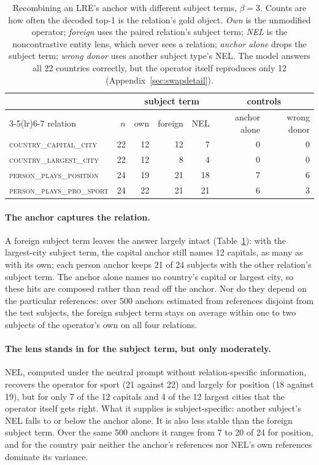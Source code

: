 \begin{table}[t]
\centering
\small
\begin{tabular}{lrrrrrr}
\toprule
& & \multicolumn{3}{c}{subject term} & \multicolumn{2}{c}{controls} \\
\cmidrule(lr){3-5}\cmidrule(lr){6-7}
relation & $n$ & own & foreign & NEL & anchor alone & wrong donor \\
\midrule
\textsc{country\_capital\_city} & 22 & 12 & 12 & 7 & 0 & 0 \\
\textsc{country\_largest\_city} & 22 & 12 & 8 & 4 & 0 & 0 \\
\textsc{person\_plays\_position} & 24 & 19 & 21 & 18 & 7 & 6 \\
\textsc{person\_plays\_pro\_sport} & 24 & 22 & 21 & 21 & 6 & 3 \\
\bottomrule
\end{tabular}
\caption{Recombining an LRE's anchor with different subject terms,
$\beta = 3$. Counts are how often the decoded top-1 is the relation's
gold object. \emph{Own} is the unmodified operator; \emph{foreign} uses
the paired relation's subject term; \emph{NEL} is the noncontrastive
entity lens, which never sees a relation; \emph{anchor alone} drops the
subject term; \emph{wrong donor} uses another subject type's NEL. The model
answers all 22 countries correctly, but the operator itself reproduces
only 12 (Appendix~\ref{sec:swapdetail}).}
\label{tab:swap}
\end{table}

\paragraph{The anchor captures the relation.} A foreign subject term
leaves the answer largely intact (Table~\ref{tab:swap}): with the
largest-city subject term, the capital anchor still names 12 capitals, as
many as with its own; each person anchor keeps 21 of 24 subjects with
the other relation's subject term. The anchor alone names no country's
capital or largest city, so these hits are composed rather than read off
the anchor. Nor do they depend on the particular references: over 500
anchors estimated from references disjoint from the test subjects, the
foreign subject term stays on average within one to two subjects of the
operator's own on all four relations.

\paragraph{The lens stands in for the subject term, but only
moderately.} NEL, computed under the neutral prompt without
relation-specific information,
recovers the operator for sport (21 against 22) and largely for
position (18 against 19), but for only 7 of the 12 capitals and 4 of the
12 largest cities that the operator itself gets right. What it supplies
is subject-specific: another subject's NEL falls to or below the
anchor alone. It is also less stable than the foreign subject
term. Over the same 500 anchors it ranges from 7 to 20 of 24 for
position, and for the country pair neither the anchor's references nor
NEL's own references dominate its variance.
